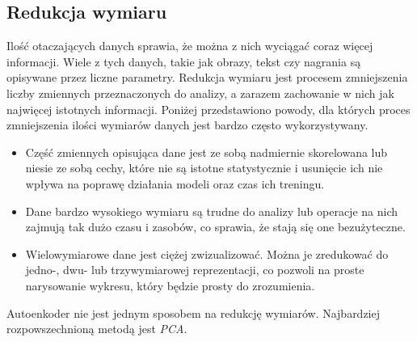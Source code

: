 \documentclass[a4paper,12pt,oneside]{book} %
\begin{document}
\subsection{Redukcja wymiaru}
Ilość otaczających danych sprawia, że można z nich wyciągać coraz więcej informacji. Wiele z tych danych, takie jak obrazy, tekst czy nagrania są opisywane przez liczne parametry. Redukcja wymiaru jest procesem zmniejszenia liczby zmiennych przeznaczonych do analizy, a zarazem zachowanie w nich jak najwięcej istotnych informacji. Poniżej przedstawiono powody, dla których proces zmniejszenia ilości wymiarów danych jest bardzo często wykorzystywany.
\begin{itemize}
	\item Część zmiennych opisująca dane jest ze sobą nadmiernie skorelowana lub niesie ze sobą cechy, które nie są istotne statystycznie i usunięcie ich nie wpływa na poprawę działania modeli oraz czas ich treningu.
	\item Dane bardzo wysokiego wymiaru są trudne do analizy lub operacje na nich zajmują tak dużo czasu i zasobów, co sprawia, że stają się one bezużyteczne. 
	\item Wielowymiarowe dane jest ciężej zwizualizować. Można je zredukować do jedno-, dwu- lub trzywymiarowej reprezentacji, co pozwoli na proste narysowanie wykresu, który będzie prosty do zrozumienia.
\end{itemize}
Autoenkoder nie jest jednym sposobem na redukcję wymiarów. Najbardziej rozpowszechnioną metodą jest \textit{PCA}. 
\end{document}
